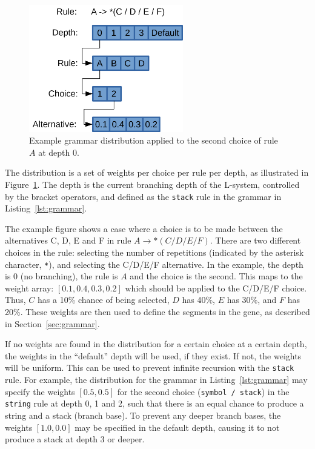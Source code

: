 \begin{figure}
    \centering
    \includegraphics[width=0.6\textwidth]{figures/distribution}
    \caption[Example grammar distribution]{Example grammar distribution applied to the second choice of rule $A$ at depth 0.}
    \label{fig:distribution}
\end{figure}

The distribution is a set of weights per choice per rule per depth, as illustrated in Figure~\ref{fig:distribution}.
The depth is the current branching depth of the \gls{L-system}, controlled by the bracket operators, and defined as the \texttt{stack} rule in the grammar in Listing~\ref{lst:grammar}.

The example figure shows a case where a choice is to be made between the alternatives C, D, E and F in rule $A \rightarrow *(C / D / E / F)$.
There are two different choices in the rule: selecting the number of repetitions (indicated by the asterisk character, \texttt{*}), and selecting the C/D/E/F alternative.
In the example, the depth is 0 (no branching), the rule is $A$ and the choice is the second.
This maps to the weight array: $[0.1, 0.4, 0.3, 0.2]$ which should be applied to the C/D/E/F choice.
Thus, $C$ has a 10\% chance of being selected, $D$ has 40\%, $E$ has 30\%, and $F$ has 20\%.
These weights are then used to define the segments in the gene, as described in Section~\ref{sec:grammar}.

If no weights are found in the distribution for a certain choice at a certain depth, the weights in the ``default'' depth will be used, if they exist.
If not, the weights will be uniform.
This can be used to prevent infinite recursion with the \texttt{stack} rule.
For example, the distribution for the grammar in Listing~\ref{lst:grammar} may specify the weights $[0.5, 0.5]$ for the second choice (\texttt{symbol / stack}) in the \texttt{string} rule at depth 0, 1 and 2, such that there is an equal chance to produce a string and a stack (\gls{branch base}).
To prevent any deeper \glspl{branch base}, the weights $[1.0, 0.0]$ may be specified in the default depth, causing it to not produce a stack at depth 3 or deeper.


